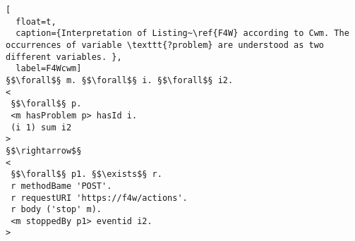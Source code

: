 



\begin{lstlisting}[
  float=t,
  caption={Interpretation of Listing~\ref{F4W} according to Cwm. The occurrences of variable \texttt{?problem} are understood as two different variables. },
  label=F4Wcwm]
§$\forall$§ m. §$\forall$§ i. §$\forall$§ i2.
<
 §$\forall$§ p.
 <m hasProblem p> hasId i.
 (i 1) sum i2 
> 
§$\rightarrow$§
<
 §$\forall$§ p1. §$\exists$§ r. 
 r methodBame 'POST'. 
 r requestURI 'https://f4w/actions'.
 r body ('stop' m).
 <m stoppedBy p1> eventid i2. 
>
\end{lstlisting}

